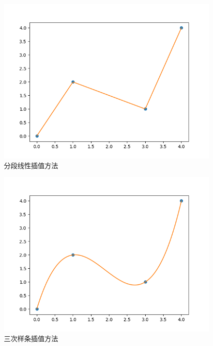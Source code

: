 \begin{figure}[htb]
    \centering

    {
        \begin{minipage}[b]{.9\linewidth}
            \centering
            \includegraphics[scale=0.6]{pic/物体轨迹/linear.png}
        \end{minipage}
    }


    \caption{分段线性插值方法}
\end{figure}

\begin{figure}[htb]
    \centering

    {
        \begin{minipage}[b]{.9\linewidth}
            \centering
            \includegraphics[scale=0.6]{pic/物体轨迹/cubic.png}
        \end{minipage}
    }


    \caption{三次样条插值方法}
\end{figure}